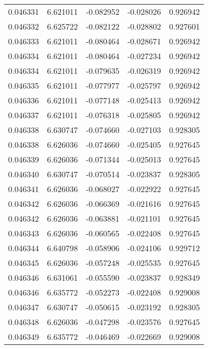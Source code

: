 \begin{tabular}{lrrrr}
0.046331    &  6.621011 & -0.082952 & -0.028026 &             0.926942 \\
0.046332    &  6.625722 & -0.082122 & -0.028802 &             0.927601 \\
0.046333    &  6.621011 & -0.080464 & -0.028671 &             0.926942 \\
0.046334    &  6.621011 & -0.080464 & -0.027234 &             0.926942 \\
0.046334    &  6.621011 & -0.079635 & -0.026319 &             0.926942 \\
0.046335    &  6.621011 & -0.077977 & -0.025797 &             0.926942 \\
0.046336    &  6.621011 & -0.077148 & -0.025413 &             0.926942 \\
0.046337    &  6.621011 & -0.076318 & -0.025805 &             0.926942 \\
0.046338    &  6.630747 & -0.074660 & -0.027103 &             0.928305 \\
0.046338    &  6.626036 & -0.074660 & -0.025405 &             0.927645 \\
0.046339    &  6.626036 & -0.071344 & -0.025013 &             0.927645 \\
0.046340    &  6.630747 & -0.070514 & -0.023837 &             0.928305 \\
0.046341    &  6.626036 & -0.068027 & -0.022922 &             0.927645 \\
0.046342    &  6.626036 & -0.066369 & -0.021616 &             0.927645 \\
0.046342    &  6.626036 & -0.063881 & -0.021101 &             0.927645 \\
0.046343    &  6.626036 & -0.060565 & -0.022408 &             0.927645 \\
0.046344    &  6.640798 & -0.058906 & -0.024106 &             0.929712 \\
0.046345    &  6.626036 & -0.057248 & -0.025535 &             0.927645 \\
0.046346    &  6.631061 & -0.055590 & -0.023837 &             0.928349 \\
0.046346    &  6.635772 & -0.052273 & -0.022408 &             0.929008 \\
0.046347    &  6.630747 & -0.050615 & -0.023192 &             0.928305 \\
0.046348    &  6.626036 & -0.047298 & -0.023576 &             0.927645 \\
0.046349    &  6.635772 & -0.046469 & -0.022669 &             0.929008 \\

\end{tabular}
